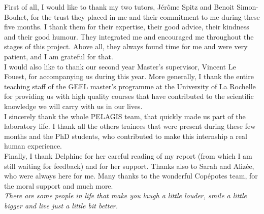 
First of all, I would like to thank my two tutors, Jérôme Spitz and Benoit Simon-Bouhet, for the trust they placed in me and their commitment to me during these five months. I thank them for their expertise, their good advice, their kindness and their good humour. They integrated me and encouraged me throughout the stages of this project. Above all, they always found time for me and were very patient, and I am grateful for that. \\

I would also like to thank our second year Master's supervisor, Vincent Le Fouest, for accompanying us during this year. More generally, I thank the entire teaching staff of the GEEL master's programme at the University of La Rochelle for providing us with high quality courses that have contributed to the scientific knowledge we will carry with us in our lives. \\

I sincerely thank the whole PELAGIS team, that quickly made us part of the laboratory life. I thank all the others trainees that were present during these few months and the PhD students, who contributed to make this internship a real human experience. \\

Finally, I thank Delphine for her careful reading of my report (from which I am still waiting for feedback) and for her support. Thanks also to Sarah and Alizée, who were always here for me. Many thanks to the wonderful Copépotes team, for the moral support and much more.\\

\textit{There are some people in life that make you laugh a little louder, smile a little bigger and live just a little bit better.}